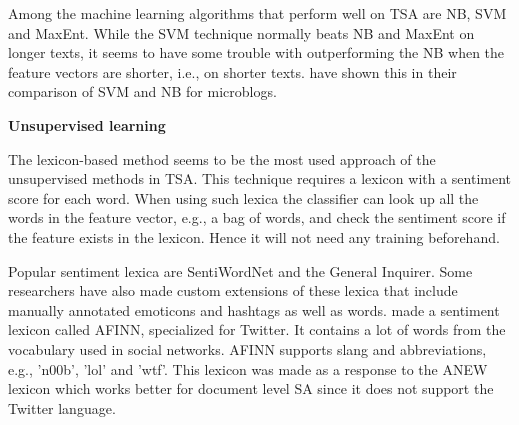 Among the machine learning algorithms that perform well on TSA are NB, SVM and MaxEnt. While the SVM technique normally beats NB and MaxEnt on longer texts, it seems to have some trouble with outperforming the NB when the feature vectors are shorter, i.e., on shorter texts. \cite{article:bermingham} have shown this in their comparison of SVM and NB for microblogs.\vspace{8 mm}

\noindent
\textbf{Unsupervised learning} \\
\noindent 

The lexicon-based method seems to be the most used approach of the unsupervised methods in TSA. This technique requires a lexicon with a sentiment score for each word. When using such lexica the classifier can look up all the words in the feature vector, e.g., a bag of words, and check the sentiment score if the feature exists in the lexicon. Hence it will not need any training beforehand.
	
Popular sentiment lexica are SentiWordNet and the General Inquirer. Some researchers have also made custom extensions of these lexica that include manually annotated emoticons and hashtags as well as words. \cite{article:afinn} made a sentiment lexicon called AFINN, specialized for Twitter. It contains a lot of words from the vocabulary used in social networks. AFINN supports slang and abbreviations, e.g., 'n00b', 'lol' and 'wtf'. This lexicon was made as a response to the ANEW lexicon which works better for document level SA since it does not support the Twitter language.
